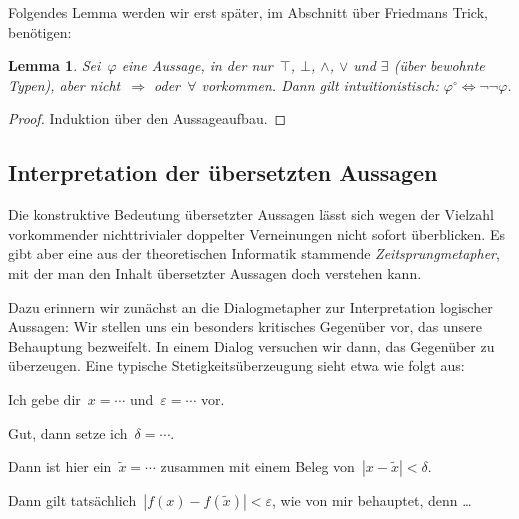 \documentclass[a4paper,ngerman,12pt]{scrartcl}
\theoremstyle{definition}
\theoremstyle{plain}
\newtheorem{lemma}[defn]{Lemma}
\theoremstyle{remark}
\renewcommand{\_}{\mathpunct{.}\,}
\newcommand{\?}{\,{:}\,}
\newcommand{\Alice}{\item[Alice]}
\newcommand{\Eve}{\item[Eve]}
\newenvironment{dialogue}{%
  \begin{list}{}{%
    \settowidth{\labelwidth}{\qquad\emph{Alice:}}
    \setlength{\labelsep}{0.3cm}
    \setlength{\leftmargin}{\labelwidth}
    \addtolength{\leftmargin}{\labelsep}
    \setlength{\rightmargin}{0pt}
    \setlength{\parsep}{0.5ex plus 0.2ex minus 0.1ex}
    \setlength{\itemsep}{0 ex plus 0.2ex}
    \renewcommand{\makelabel}[1]{\qquad\emph{##1:}\hfil}
    }
}{\end{list}}
\begin{document}
Folgendes Lemma werden wir erst später, im Abschnitt über Friedmans Trick, benötigen:
\begin{lemma}\label{dnt:geom}Sei~$\varphi$ eine Aussage, in der nur~$\top$, $\bot$,
$\wedge$, $\vee$ und $\exists$ (über
bewohnte Typen), aber nicht~$\Rightarrow$ oder~$\forall$ vorkommen. Dann gilt
intuitionistisch: $\varphi^\circ \Longleftrightarrow \neg\neg\varphi$.
\end{lemma}
\begin{proof}Induktion über den Aussageaufbau.\end{proof}


\subsection{Interpretation der übersetzten Aussagen}

Die konstruktive Bedeutung übersetzter Aussagen lässt sich wegen der Vielzahl
vorkommender nichttrivialer doppelter Verneinungen nicht sofort überblicken. Es
gibt aber eine aus der theoretischen Informatik stammende
\emph{Zeitsprungmetapher}, mit der man den Inhalt übersetzter Aussagen doch
verstehen kann.

Dazu erinnern wir zunächst an die Dialogmetapher zur Interpretation logischer
Aussagen:
Wir stellen uns ein besonders kritisches Gegenüber vor, das unsere Behauptung
bezweifelt. In einem Dialog versuchen wir dann, das Gegenüber zu überzeugen.
Eine typische Stetigkeitsüberzeugung sieht etwa wie folgt aus:

\begin{dialogue}
\Eve Ich gebe dir~$x = \cdots$ und~$\varepsilon = \cdots$ vor.
\Alice Gut, dann setze ich~$\delta = \cdots$.
\Eve Dann ist hier ein~$\tilde x = \cdots$ zusammen mit einem Beleg von~$|x -
\tilde x| < \delta$.
\Alice Dann gilt tatsächlich~$|f(x) - f(\tilde x)| < \varepsilon$,
wie von mir behauptet, denn \ldots
\end{dialogue}
\end{document}
